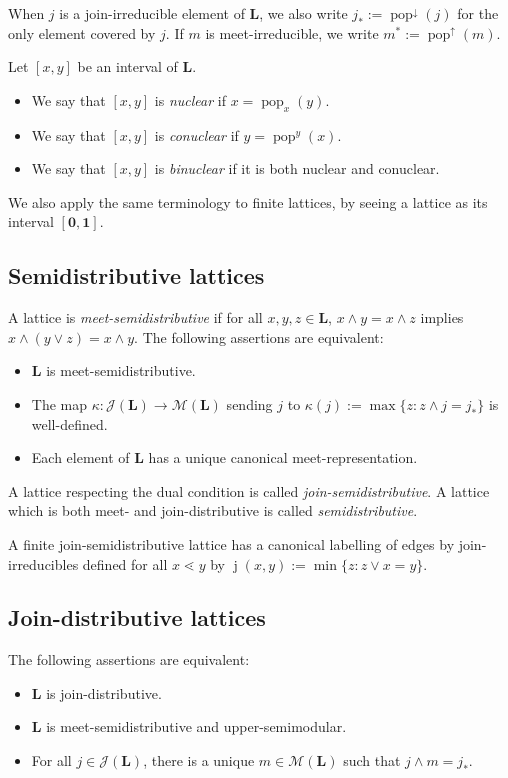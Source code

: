 \documentclass[leqno, 12pt]{amsart}
\numberwithin{equation}{section}
\renewcommand{\L}{\mathbf L}
\newcommand{\JIrr}{\mathcal J}
\newcommand{\MIrr}{\mathcal M}
\newcommand{\pop}{\operatorname{pop}}
\newcommand{\popdown}{\operatorname{pop}^\downarrow}
\newcommand{\popup}{\operatorname{pop}^\uparrow}
\newcommand{\Lmin}{\mathbf 0}
\newcommand{\Lmax}{\mathbf 1}
\newcommand{\joinlabel}{\operatorname{j}}
\newcommand{\darkblue}{\color{darkblue}} %
\newcommand{\defn}[1]{\textsl{\darkblue #1}} %
\numberwithin{equation}{section}
\theoremstyle{remark}
\begin{document}
When $j$ is a join-irreducible element of $\L$, we also write $j_*:= \popdown(j)$ for the only element covered by $j$. If $m$ is meet-irreducible, we write $m^*:=\popup(m)$.

    Let $[x,y]$ be an interval of $\L$.
    \begin{itemize}
    \item We say that $[x,y]$ is \defn{nuclear} if $x=\pop_x(y).$
    \item We say that $[x,y]$ is \defn{conuclear} if $y=\pop^y(x).$
    \item We say that $[x,y]$ is \defn{binuclear} if it is both nuclear and conuclear.
    \end{itemize}

We also apply the same terminology to finite lattices, by seeing a lattice as its interval $[\Lmin,\Lmax]$.

\subsection{Semidistributive lattices}
A lattice is \defn{meet-semidistributive} if for all $x,y,z\in \L$, $x\wedge y=x\wedge z$ implies $x\wedge(y\vee z)=x\wedge y$.
The following assertions are equivalent:
\begin{itemize}
\item $\L$ is meet-semidistributive.
\item The map $\kappa:\JIrr(\L) \to \MIrr(\L)$ sending $j$ to $\kappa(j):=\max\{z:z\wedge j=j_*\}$ is well-defined.
\item Each element of $\L$ has a unique canonical meet-representation.
\end{itemize}

A lattice respecting the dual condition is called \defn{join-semidistributive}. A lattice which is both meet- and join-distributive is called \defn{semidistributive}.

A finite join-semidistributive lattice has a canonical labelling of edges by join-irreducibles defined for all $x\lessdot y$ by $\joinlabel(x,y):=\min\{z:z\vee x=y\}$.
\subsection{Join-distributive lattices}

The following assertions are equivalent:
\begin{itemize}
\item $\L$ is join-distributive.
\item $\L$ is meet-semidistributive and upper-semimodular.
\item For all $j\in \JIrr(\L)$, there is a unique $m\in \MIrr(\L)$ such that $j\wedge m=j_*$.
\end{itemize}
\end{document}
